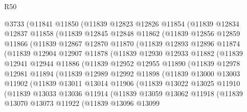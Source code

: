\begin{lexlean}{R50}
\begin{coremodule}
    @3733
      (@11841
        @11850
        (@11839
          @12823
          @12826
          @11854
          (@11839
            @12834
            @12837
            @11858
            (@11839
              @12845
              @12848
              @11862
              (@11839
                @12856
                @12859
                @11866
                (@11839
                  @12867
                  @12870
                  @11870
                  (@11839
                    @12893
                    @12896
                    @11874
                    (@11839
                      @12904
                      @12907
                      @11878
                      (@11839
                        @12930
                        @12933
                        @11882
                        (@11839
                          @12941
                          @12944
                          @11886
                          (@11839
                            @12952
                            @12955
                            @11890
                            (@11839
                              @12978
                              @12981
                              @11894
                              (@11839
                                @12989
                                @12992
                                @11898
                                (@11839
                                  @13000
                                  @13003
                                  @11902
                                  (@11839
                                    @13011
                                    @13014
                                    @11906
                                    (@11839
                                      @13022
                                      @13025
                                      @11910
                                      (@11839
                                        @13033
                                        @13036
                                        @11914
                                        (@11839
                                          @13059
                                          @13062
                                          @11918
                                          (@11839
                                            @13070
                                            @13073
                                            @11922
                                            (@11839
                                              @13096
                                              @13099

\end{coremodule}
\end{lexlean}
